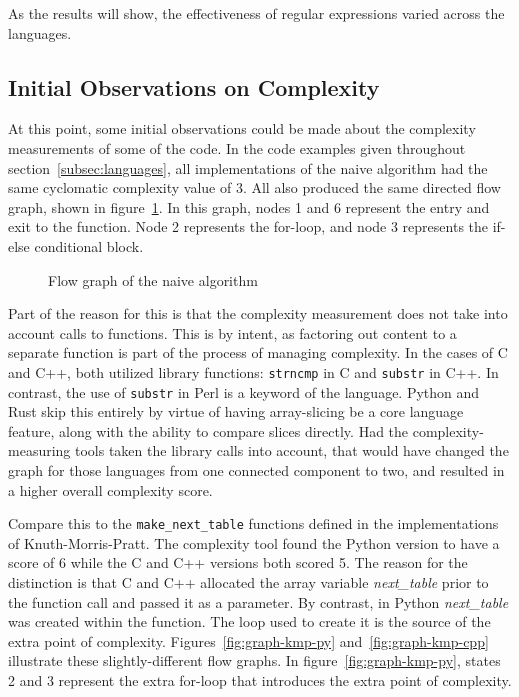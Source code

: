 As the results will show, the effectiveness of regular expressions varied across the languages.

\subsection{Initial Observations on Complexity}

At this point, some initial observations could be made about the complexity measurements of some of the code. In the code examples given throughout section~\ref{subsec:languages}, all implementations of the naive algorithm had the same cyclomatic complexity value of 3. All also produced the same directed flow graph, shown in figure~\ref{fig:graph-naive}. In this graph, nodes 1 and 6 represent the entry and exit to the function. Node 2 represents the for-loop, and node 3 represents the if-else conditional block.

\begin{figure}[ht]
    \centering
    
    \caption{Flow graph of the naive algorithm}
    \label{fig:graph-naive}
\end{figure}

Part of the reason for this is that the complexity measurement does not take into account calls to functions. This is by intent, as factoring out content to a separate function is part of the process of managing complexity. In the cases of C and C++, both utilized library functions: \texttt{strncmp} in C and \texttt{substr} in C++. In contrast, the use of \texttt{substr} in Perl is a keyword of the language. Python and Rust skip this entirely by virtue of having array-slicing be a core language feature, along with the ability to compare slices directly. Had the complexity-measuring tools taken the library calls into account, that would have changed the graph for those languages from one connected component to two, and resulted in a higher overall complexity score.

Compare this to the \texttt{make\_next\_table} functions defined in the implementations of Knuth-Morris-Pratt. The complexity tool found the Python version to have a score of 6 while the C and C++ versions both scored 5. The reason for the distinction is that C and C++ allocated the array variable \textit{next\_table} prior to the function call and passed it as a parameter. By contrast, in Python \textit{next\_table} was created within the function. The loop used to create it is the source of the extra point of complexity. Figures~\ref{fig:graph-kmp-py} and~\ref{fig:graph-kmp-cpp} illustrate these slightly-different flow graphs. In figure~\ref{fig:graph-kmp-py}, states 2 and 3 represent the extra for-loop that introduces the extra point of complexity.

